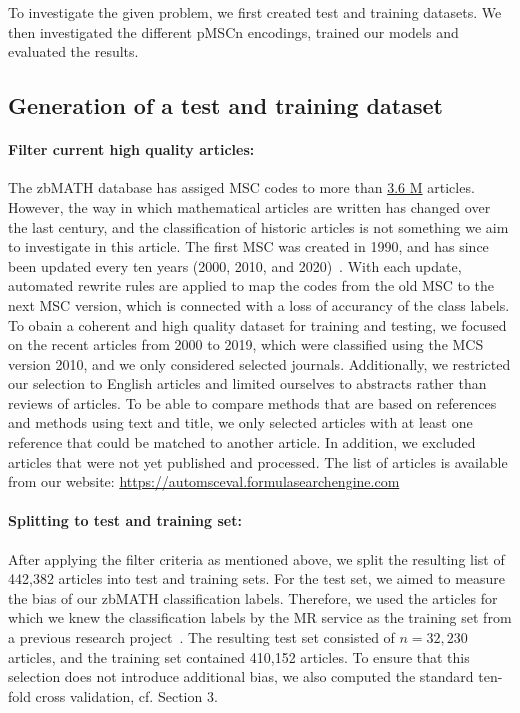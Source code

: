 To investigate the given problem, we first created test and training datasets.
We then investigated the different pMSCn encodings, trained our models and evaluated the results.

\subsection{Generation of a test and training dataset}
\paragraph{Filter current high quality articles:}
The zbMATH database has assiged MSC codes to more than \href{https://zbmath.org/?q=cc\%3A*}{3.6 M} articles.
However, the way in which mathematical articles are written has changed over the last century, and the classification of historic articles is not something we aim to investigate in this article. The first MSC was created in 1990, and has since been updated every ten years (2000, 2010, and 2020)~\cite{MSC2010}.
With each update, automated rewrite rules are applied to map the codes from the old MSC to the next MSC version, which is connected with a loss of accurancy of the class labels.
To obain a coherent and high quality dataset for training and testing, we focused on the recent articles from 2000 to 2019, which were classified using the MCS version 2010, and we only considered selected journals.
Additionally, we restricted our selection to English articles and limited ourselves to abstracts rather than reviews of articles.
To be able to compare methods that are based on references and methods using text and title, we only selected articles with at least one reference that could be matched to another article.
In addition, we excluded articles that were not yet published and processed.
The list of articles is available from our website: \url{https://automsceval.formulasearchengine.com}
\paragraph{Splitting to test and training set:}
After applying the filter criteria as mentioned above, we split the resulting list of 442,382 articles into test and training sets.
For the test set, we aimed to measure the bias of our zbMATH classification labels.
Therefore, we used the articles for which we knew the classification labels by the MR service as the training set from a previous research project~\cite{Bannister2018}.
The resulting test set consisted of \(n = 32,230\) articles, and the training set contained 410,152 articles.
To ensure that this selection does not introduce additional bias, we also computed the standard ten-fold cross validation, cf. Section 3.
